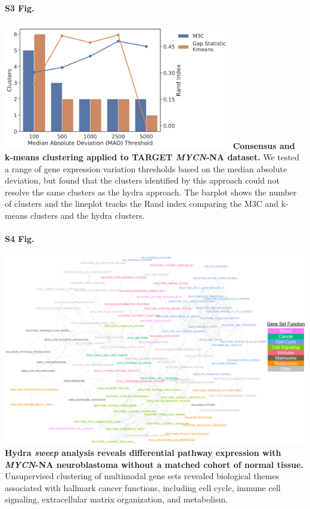 \documentclass[10pt,letterpaper]{article}
\begin{document}
\paragraph*{S3 Fig.}
\includegraphics[width=0.75\textwidth]{img/PNG/clustering-screen}
\label{S3_Fig}
{\bf{Consensus and k-means clustering applied to TARGET \textit{MYCN}-NA dataset.}} We tested a range of gene expression variation thresholds based on the median absolute deviation, but found that the clusters identified by this approach could not resolve the same clusters as the hydra approach. The barplot shows the number of clusters and the lineplot tracks the Rand index comparing the M3C and k-means clusters and the hydra clusters.

\paragraph*{S4 Fig.}
\includegraphics[width=\textwidth]{img/PNG/sweep-gene-set-network-V4-2x}
\label{S4_Fig}{\bf Hydra \textit{sweep} analysis reveals differential pathway expression with \textit{MYCN}-NA neuroblastoma without a matched cohort of normal tissue.}
Unsupervised clustering of multimodal gene sets revealed biological themes associated with hallmark cancer functions, including cell cycle, immune cell signaling, extracellular matrix organization, and metabolism.
\end{document}

